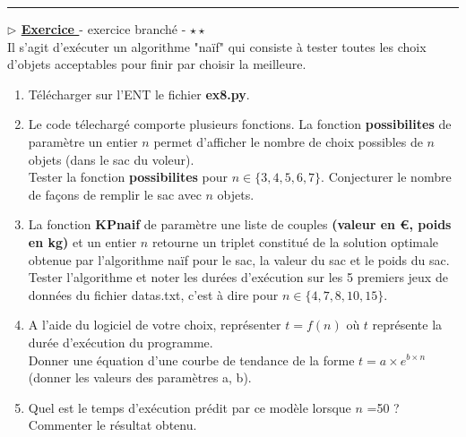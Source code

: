 \documentclass[12pt,french]{article}
\newcounter{npb}
\newcommand{\exo}{
    \stepcounter{npb}
    {\textbf{$\triangleright$ \underline{Exercice \arabic{npb} }}}
}
\begin{document}
\hrule
\medskip
\exo - exercice branché - $\star\star$  \\	
Il s'agit d'exécuter un algorithme "naïf" qui consiste à tester toutes les choix d'objets acceptables pour finir par choisir la meilleure. 
\begin{enumerate}
	\item Télécharger sur l'ENT le fichier \textbf{ex8.py}.
	\item Le code télechargé comporte plusieurs fonctions. La fonction \textbf{possibilites} de paramètre un entier $n$ permet d'afficher le nombre de choix possibles de $n$ objets (dans le sac du voleur).\\	Tester la fonction  \textbf{possibilites} pour   \(n \in \{3,4,5,6,7\} \). Conjecturer le nombre de façons de remplir le sac avec $n$ objets.
	\item La fonction \textbf{KPnaif} de paramètre une liste de couples  \textbf{(valeur en €, poids en kg)} et un entier $n$  retourne  un triplet constitué de la solution optimale obtenue par l'algorithme naïf pour le sac, la valeur du sac et le poids du sac. Tester l'algorithme et noter les durées d'exécution sur les 5 premiers jeux de données du fichier datas.txt, c'est à dire pour $n  \in \{4,7,8,10,15 \}$.
	\item  A l'aide du logiciel de votre choix, représenter $t=f(n)$ où $t$ représente la durée d'exécution du programme.\\
	 Donner une équation d'une courbe de tendance de la forme $t=a\times e^{b\times n}$ (donner les valeurs des paramètres a, b).
	\item Quel est le temps d'exécution prédit par ce modèle lorsque $n$ =50 ? Commenter le résultat obtenu.
\end{enumerate}	
\end{document}
